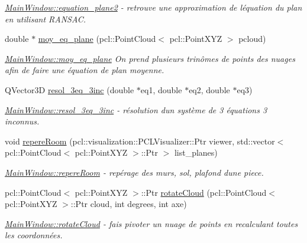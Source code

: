 \begin{DoxyCompactItemize}
\begin{DoxyCompactList}\small\item\em \hyperlink{classMainWindow_a616d841913b70481fe6872e874dc090b}{Main\+Window\+::equation\+\_\+plane2} -\/ retrouve une approximation de l\textquotesingle{}équation du plan en utilisant R\+A\+N\+S\+AC. \end{DoxyCompactList}\item 
double $\ast$ \hyperlink{classMainWindow_a270e2529573f70c73c0c96379add233d}{moy\+\_\+eq\+\_\+plane} (pcl\+::\+Point\+Cloud$<$ pcl\+::\+Point\+X\+YZ $>$ pcloud)
\begin{DoxyCompactList}\small\item\em \hyperlink{classMainWindow_a270e2529573f70c73c0c96379add233d}{Main\+Window\+::moy\+\_\+eq\+\_\+plane} On prend plusieurs trinômes de points des nuages afin de faire une équation de plan moyenne. \end{DoxyCompactList}\item 
Q\+Vector3D \hyperlink{classMainWindow_a67a37a0adb8dc9c349e6ccca029c6a1e}{resol\+\_\+3eq\+\_\+3inc} (double $\ast$eq1, double $\ast$eq2, double $\ast$eq3)
\begin{DoxyCompactList}\small\item\em \hyperlink{classMainWindow_a67a37a0adb8dc9c349e6ccca029c6a1e}{Main\+Window\+::resol\+\_\+3eq\+\_\+3inc} -\/ résolution d\textquotesingle{}un système de 3 équations 3 inconnus. \end{DoxyCompactList}\item 
void \hyperlink{classMainWindow_a74c5655d5716cf30d2647c2a1cf757a4}{repere\+Room} (pcl\+::visualization\+::\+P\+C\+L\+Visualizer\+::\+Ptr viewer, std\+::vector$<$ pcl\+::\+Point\+Cloud$<$ pcl\+::\+Point\+X\+YZ $>$\+::Ptr $>$ list\+\_\+planes)
\begin{DoxyCompactList}\small\item\em \hyperlink{classMainWindow_a74c5655d5716cf30d2647c2a1cf757a4}{Main\+Window\+::repere\+Room} -\/ repérage des murs, sol, plafond d\textquotesingle{}une piece. \end{DoxyCompactList}\item 
pcl\+::\+Point\+Cloud$<$ pcl\+::\+Point\+X\+YZ $>$\+::Ptr \hyperlink{classMainWindow_a64c3b822b3ec2d55e2c999d5fda2981e}{rotate\+Cloud} (pcl\+::\+Point\+Cloud$<$ pcl\+::\+Point\+X\+YZ $>$\+::Ptr cloud, int degrees, int axe)
\begin{DoxyCompactList}\small\item\em \hyperlink{classMainWindow_a64c3b822b3ec2d55e2c999d5fda2981e}{Main\+Window\+::rotate\+Cloud} -\/ fais pivoter un nuage de points en recalculant toutes les coordonnées. \end{DoxyCompactList}\item 

\end{DoxyCompactItemize}

